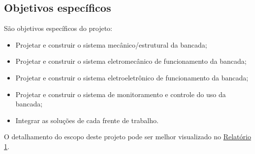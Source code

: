   \subsection{Objetivos específicos}
       São objetivos específicos do projeto:
       \begin{itemize}

        \item Projetar e construir o sistema mecânico/estrutural da bancada;
        \item Projetar e construir o sistema eletromecânico de funcionamento da bancada;
        \item Projetar e construir o sistema eletroeletrônico de funcionamento da bancada;
        \item Projetar e construir o sistema de monitoramento e controle do uso da bancada;
        \item Integrar as soluções de cada frente de trabalho.
       \end{itemize}

	O detalhamento do escopo deste projeto pode ser melhor visualizado no \href{https://drive.google.com/file/d/0B5InkGKx6O-MR1B3eVYzZFpjQ3c/view?usp=sharing}{Relatório 1}. 
       


